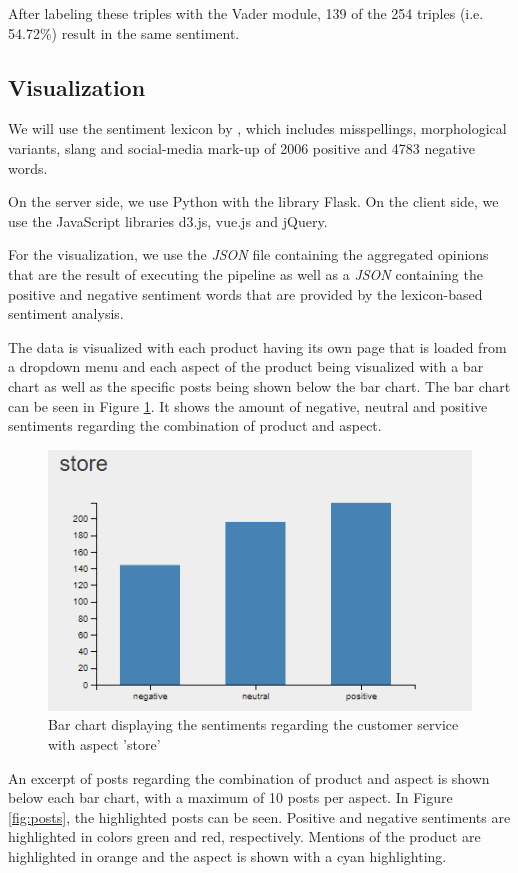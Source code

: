 \documentclass[10pt,a4paper]{article}
\begin{document}
	After labeling these triples with the Vader module, 139 of the 254 triples (i.e. 54.72\%) result in the same sentiment.

		\subsection{Visualization}
		We will use the sentiment lexicon by \cite{Hu:2004:MSC:1014052.1014073}, which includes misspellings, morphological variants, slang and social-media mark-up of 2006 positive and 4783 negative words.

		On the server side, we use Python with the library Flask. On the client side, we use the JavaScript libraries d3.js, vue.js and jQuery.
	
		For the visualization, we use the \textit{JSON} file containing the aggregated opinions that are the result of executing the pipeline as well as a \textit{JSON} containing the positive and negative sentiment words that are provided by the lexicon-based sentiment analysis.
	
		The data is visualized with each product having its own page that is loaded from a dropdown menu and each aspect of the product being visualized with a bar chart as well as the specific posts being shown below the bar chart. The bar chart can be seen in Figure \ref{fig:barchart}. It shows the amount of negative, neutral and positive sentiments regarding the combination of product and aspect.
	
		\begin{figure}[h]
			\centering
			\includegraphics[width=0.7\linewidth]{data/barchart}
			\caption{Bar chart displaying the sentiments regarding the customer service with aspect 'store'}
			\label{fig:barchart}
		\end{figure}
			
		An excerpt of posts regarding the combination of product and aspect is shown below each bar chart, with a maximum of 10 posts per aspect. In Figure \ref{fig:posts}, the highlighted posts can be seen. Positive and negative sentiments are highlighted in colors green and red, respectively. Mentions of the product are highlighted in orange and the aspect is shown with a cyan highlighting.
			
\end{document}
